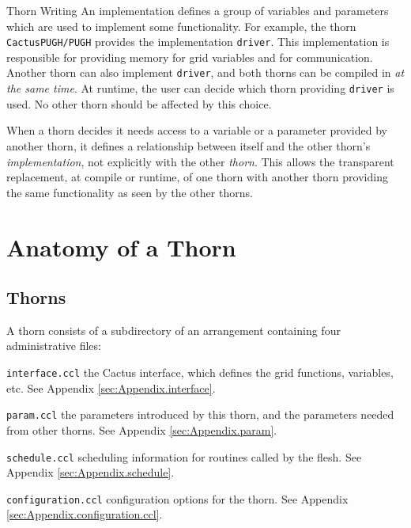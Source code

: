 \begin{cactuspart}{Thorn Writing}
An implementation defines a group of variables and parameters which
are used to implement some functionality.  For example, the thorn
\texttt{CactusPUGH/PUGH} provides the implementation \texttt{driver}.  This
implementation is responsible for providing memory for grid variables and
for communication.  Another thorn can also implement \texttt{driver},
and both thorns can be compiled in \emph{at the same time}.
At runtime, the user can decide which thorn providing \texttt{driver} is used.
No other thorn should be affected by this choice.

When a thorn decides it needs access to a variable or a parameter provided by
another thorn, it defines a relationship between itself and the other thorn's
\emph{implementation}, not explicitly with the other \emph{thorn}.
This allows the transparent replacement, at compile or runtime, of one
thorn with another thorn providing the same functionality as seen by
the other thorns.


\section{Anatomy of a Thorn}
\label{chap:thorn_anatomy}


\subsection{Thorns}

A thorn consists of a subdirectory of an arrangement containing four
administrative files:

\begin{Lentry}
\item[\texttt{interface.ccl}] the Cactus interface, which defines the grid
functions, variables, etc. See Appendix \ref{sec:Appendix.interface}.
\item[\texttt{param.ccl}] the parameters introduced by this thorn, and the
parameters needed from other thorns. See  Appendix 
\ref{sec:Appendix.param}.
\item[\texttt{schedule.ccl}] scheduling information for routines called by
the flesh. See Appendix  \ref{sec:Appendix.schedule}.
\item[\texttt{configuration.ccl}] configuration options for the thorn. See
 Appendix  \ref{sec:Appendix.configuration.ccl}.
\end{Lentry}


\end{cactuspart}
